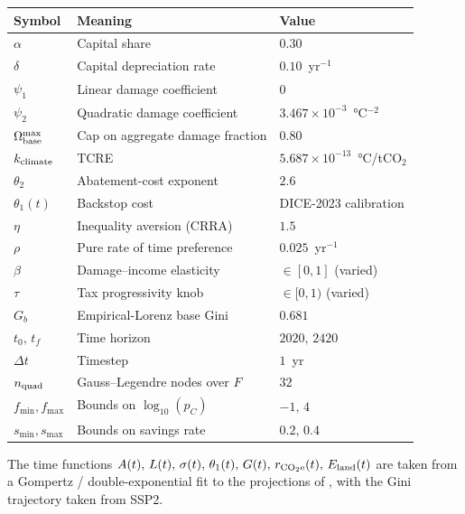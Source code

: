 \begin{center}
\begin{tabular}{l l l}
\hline
\textbf{Symbol} & \textbf{Meaning} & \textbf{Value} \\
\hline
$\alpha$           & Capital share                                  & $0.30$ \\
$\delta$           & Capital depreciation rate                      & $0.10$~yr$^{-1}$ \\
$\psi_1$           & Linear damage coefficient                      & $0$ \\
$\psi_2$           & Quadratic damage coefficient                   & $3.467 \times 10^{-3}$~\si{\celsius}$^{-2}$ \\
$\Omega_{\rm base}^{\max}$ & Cap on aggregate damage fraction       & $0.80$ \\
$k_{\rm climate}$  & TCRE                                           & $5.687 \times 10^{-13}$~\si{\celsius}/tCO$_2$ \\
$\theta_2$         & Abatement-cost exponent                        & $2.6$ \\
$\theta_1(t)$      & Backstop cost                                  & DICE-2023 calibration \\
$\eta$             & Inequality aversion (CRRA)                     & $1.5$ \\
$\rho$             & Pure rate of time preference                   & $0.025$~yr$^{-1}$ \\
$\beta$            & Damage--income elasticity                       & $\in [0,1]$ (varied) \\
$\tau$             & Tax progressivity knob                          & $\in [0,1)$ (varied) \\
$G_b$              & Empirical-Lorenz base Gini                     & $0.681$ \\
$t_0,\,t_f$        & Time horizon                                   & $2020,\,2420$ \\
$\Delta t$         & Timestep                                       & $1$~yr \\
$n_{\rm quad}$     & Gauss--Legendre nodes over $F$                 & $32$ \\
$f_{\min}, f_{\max}$ & Bounds on $\log_{10}(p_C)$                   & $-1,\,4$ \\
$s_{\min}, s_{\max}$ & Bounds on savings rate                       & $0.2,\,0.4$ \\
\hline
\end{tabular}
\end{center}

The time functions $A(t),\, L(t),\, \sigma(t),\, \theta_1(t),\, G(t),\, r_{\rm CO_2e}(t),\, E_{\rm land}(t)$ are taken from a Gompertz / double-exponential fit to the projections of \citet{Barrage2024}, with the Gini trajectory taken from SSP2.

